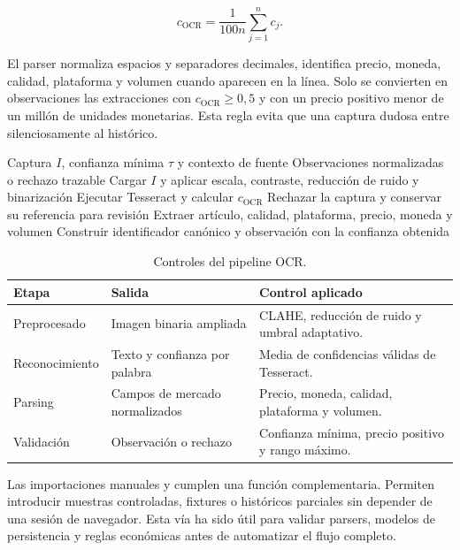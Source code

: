 \[
c_{\mathrm{OCR}}=\frac{1}{100n}\sum_{j=1}^{n} c_j.
\]

El parser normaliza espacios y separadores decimales, identifica precio, moneda, calidad, plataforma y volumen cuando aparecen en la línea. Solo se convierten en observaciones las extracciones con $c_{\mathrm{OCR}}\geq 0{,}5$ y con un precio positivo menor de un millón de unidades monetarias. Esta regla evita que una captura dudosa entre silenciosamente al histórico.

\begin{algorithm}[H]
\caption{Extracción OCR.}
\label{alg:ocr-validado}
\begin{algorithmic}[1]
\Require Captura $I$, confianza mínima $\tau$ y contexto de fuente
\Ensure Observaciones normalizadas o rechazo trazable
\State Cargar $I$ y aplicar escala, contraste, reducción de ruido y binarización
\State Ejecutar Tesseract y calcular $c_{\mathrm{OCR}}$
  \State Rechazar la captura y conservar su referencia para revisión
\Else
    \State Extraer artículo, calidad, plataforma, precio, moneda y volumen
      \State Construir identificador canónico y observación con la confianza obtenida
    \EndIf
  \EndFor
\EndIf
\end{algorithmic}
\end{algorithm}

\begin{table}[h]
\centering
\begin{tabularx}{\textwidth}{>{\raggedright\arraybackslash}p{} >{\raggedright\arraybackslash}p{} >{\raggedright\arraybackslash}X}
\toprule
Etapa & Salida & Control aplicado \\
\midrule
Preprocesado & Imagen binaria ampliada & CLAHE, reducción de ruido y umbral adaptativo. \\
Reconocimiento & Texto y confianza por palabra & Media de confidencias válidas de Tesseract. \\
Parsing & Campos de mercado normalizados & Precio, moneda, calidad, plataforma y volumen. \\
Validación & Observación o rechazo & Confianza mínima, precio positivo y rango máximo. \\
\bottomrule
\end{tabularx}
\caption{Controles del pipeline OCR.}
\label{tab:ocr-controles}
\end{table}

Las importaciones manuales y  cumplen una función complementaria. Permiten introducir muestras controladas, fixtures o históricos parciales sin depender de una sesión de navegador. Esta vía ha sido útil para validar parsers, modelos de persistencia y reglas económicas antes de automatizar el flujo completo.

